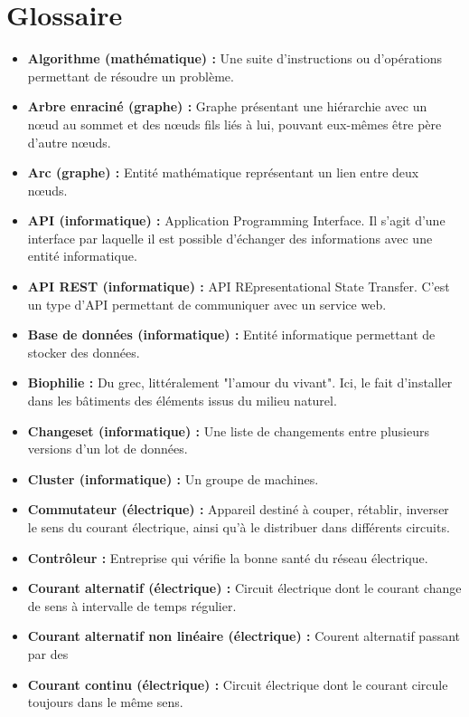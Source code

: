 \chapter*{Glossaire}

\begin{itemize}
    \item \textbf{Algorithme (mathématique) :} Une suite d'instructions ou d'opérations permettant de résoudre un problème.
    \item \textbf{Arbre enraciné (graphe) :} Graphe présentant une hiérarchie avec un nœud au sommet et des nœuds fils liés à lui, pouvant eux-mêmes être père d'autre nœuds.
    \item \textbf{Arc (graphe) :} Entité mathématique représentant un lien entre deux nœuds.
    \item \textbf{API (informatique) :} Application Programming Interface. Il s'agit d'une interface par laquelle
il est possible d'échanger des informations avec une entité informatique.
    \item \textbf{API REST (informatique) :} API REpresentational State Transfer.
C'est un type d'API permettant de communiquer avec un service web.
    \item \textbf{Base de données (informatique) :} Entité informatique permettant de stocker des données.
    \item \textbf{Biophilie :} Du grec, littéralement "l'amour du vivant".
Ici, le fait d'installer dans les bâtiments des éléments issus du milieu naturel.
    \item \textbf{Changeset (informatique) :} Une liste de changements entre plusieurs versions d'un lot de données.
    \item \textbf{Cluster (informatique) :} Un groupe de machines.
    \item \textbf{Commutateur (électrique) :} Appareil destiné à couper, rétablir, inverser le sens du courant électrique, ainsi qu'à le distribuer dans différents circuits.
    \item \textbf{Contrôleur :} Entreprise qui vérifie la bonne santé du réseau électrique.
    \item \textbf{Courant alternatif (électrique) :} Circuit électrique dont le courant change de sens à intervalle de temps régulier.
    \item \textbf{Courant alternatif non linéaire (électrique) :} Courent alternatif passant par des
    \item \textbf{Courant continu (électrique) :} Circuit électrique dont le courant circule toujours dans le même sens.

\end{itemize}
